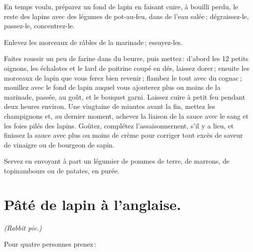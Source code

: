 En temps voulu, préparez un fond de lapin en faisant cuire, à bouilli perdu, le
reste des lapins avec des légumes de pot-au-feu, dans de l'eau salée ;
dégraissez-le, passez-le, concentrez-le.

Enlevez les morceaux de râbles de la marinade ; essuyez-les.

Faites roussir un peu de farine dans du beurre, puis mettez : d'abord les 12
petits oignons, les échalotes et le lard de poitrine coupé en dés, laissez
dorer ; ensuite les morceaux de lapin que vous ferez bien revenir ; flambez le
tout avec du cognac ; mouillez avec le fond de lapin auquel vous ajouterez plus
ou moins de la marinade, passée, au goût, et le bouquet garni. Laissez cuire
à petit feu pendant deux heures environ. Une vingtaine de minutes avant la fin,
mettez les champignons et, au dernier moment, achevez la liaison de la sauce
avec le sang et les foies pilés des lapins. Goûtez, complétez
l'assaisonnernent, s'il y a lieu, et finissez la sauce avec plus ou moins de
crème pour corriger tout excès de saveur de vinaigre ou de bourgeon de sapin.

Servez en envoyant à part un légumier de pommes de terre, de marrons, de
topinambours ou de patates, en purée.

\section*{\centering Pâté de lapin à l'anglaise.}
{}

\centering\textit{(Rabbit pie.)}

\bigskip

\justifying

Pour quatre personnes prenez :

\medskip

